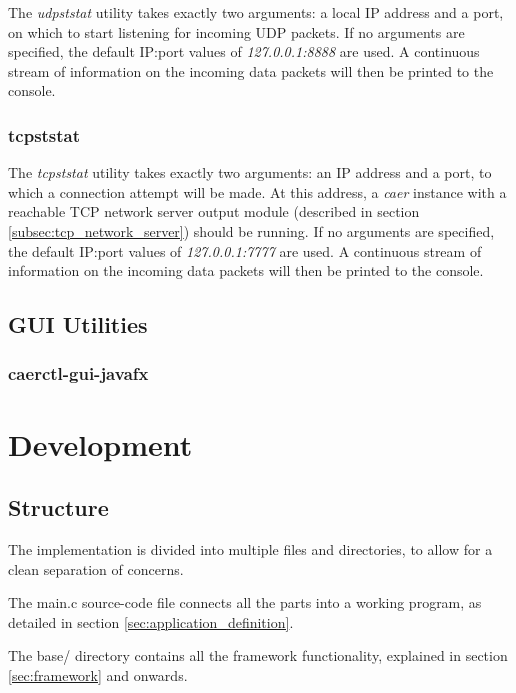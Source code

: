 \documentclass[a4paper,12pt]{report}
\begin{document}
The \emph{udpststat} utility takes exactly two arguments: a local IP address and a port, on which to start listening for incoming UDP packets.
If no arguments are specified, the default IP:port values of \emph{127.0.0.1:8888} are used.
A continuous stream of information on the incoming data packets will then be printed to the console.

\subsection{tcpststat} \label{subsec:tcpststat}

The \emph{tcpststat} utility takes exactly two arguments: an IP address and a port, to which a connection attempt will be made. At this address, a \emph{caer} instance with a reachable TCP network server output module (described in section \ref{subsec:tcp_network_server}) should be running.
If no arguments are specified, the default IP:port values of \emph{127.0.0.1:7777} are used.
A continuous stream of information on the incoming data packets will then be printed to the console.

\section{GUI Utilities} \label{sec:gui_utilities}

\subsection{caerctl-gui-javafx}

\chapter{Development} \label{chap:development}

\section{Structure} \label{sec:structure}

The implementation is divided into multiple files and directories, to allow for a clean separation of concerns.

The main.c source-code file connects all the parts into a working program, as detailed in section \ref{sec:application_definition}.

The base/ directory contains all the framework functionality, explained in section \ref{sec:framework} and onwards.
\end{document}
